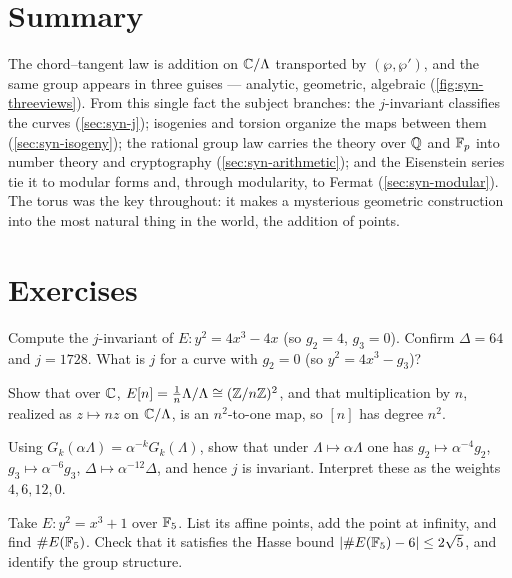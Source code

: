 \section{Summary}
\label{sec:syn-summary}

The chord--tangent law is addition on \(\mathbb{C}/\Lambda\) transported by
\((\wp, \wp')\), and the same group appears in three guises --- analytic,
geometric, algebraic (\cref{fig:syn-threeviews}). From this single fact the
subject branches: the \(j\)-invariant classifies the curves
(\cref{sec:syn-j}); isogenies and torsion organize the maps between them
(\cref{sec:syn-isogeny}); the rational group law carries the theory over \(\mathbb{Q}\)
and \(\mathbb{F}_p\) into number theory and cryptography (\cref{sec:syn-arithmetic}); and
the Eisenstein series tie it to modular forms and, through modularity, to Fermat
(\cref{sec:syn-modular}). The torus was the key throughout: it makes a mysterious
geometric construction into the most natural thing in the world, the addition of
points.

\section*{Exercises}

\begin{exercise}
\label{ex:syn-j1728}
Compute the \(j\)-invariant of \(E : y^2 = 4x^3 - 4x\) (so \(g_2 = 4\),
\(g_3 = 0\)). Confirm \(\Delta = 64\) and \(j = 1728\). What is \(j\) for a curve
with \(g_2 = 0\) (so \(y^2 = 4x^3 - g_3\))?
\end{exercise}

\begin{exercise}
\label{ex:syn-torsion}
Show that over \(\mathbb{C}\), \(E[n] = \tfrac1n\Lambda/\Lambda \cong (\mathbb{Z}/n\mathbb{Z})^2\), and
that multiplication by \(n\), realized as \(z \mapsto nz\) on \(\mathbb{C}/\Lambda\), is an
\(n^2\)-to-one map, so \([n]\) has degree \(n^2\).
\end{exercise}

\begin{exercise}
\label{ex:syn-weight}
Using \(G_k(\alpha\Lambda) = \alpha^{-k} G_k(\Lambda)\), show that under
\(\Lambda \mapsto \alpha\Lambda\) one has \(g_2 \mapsto \alpha^{-4} g_2\),
\(g_3 \mapsto \alpha^{-6} g_3\), \(\Delta \mapsto \alpha^{-12}\Delta\), and hence
\(j\) is invariant. Interpret these as the weights \(4, 6, 12, 0\).
\end{exercise}

\begin{exercise}
\label{ex:syn-hasse}
Take \(E : y^2 = x^3 + 1\) over \(\mathbb{F}_5\). List its affine points, add the point at
infinity, and find \(\#E(\mathbb{F}_5)\). Check that it satisfies the Hasse bound
\(|{\#E(\mathbb{F}_5)} - 6| \le 2\sqrt5\), and identify the group structure.
\end{exercise}
